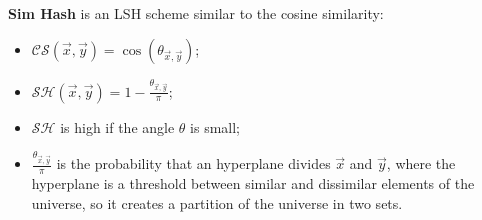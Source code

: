 	\ex \textbf{Sim Hash} is an LSH scheme similar to the cosine similarity:
	\begin{itemize}
		\item $\mathcal{CS}(\vec{x},\vec{y})=
			\cos(\theta_{\vec{x},\vec{y}}) $;
		\item $\mathcal{SH}(\vec{x},\vec{y})=
			1-\frac{\theta_{\vec{x},\vec{y}}}{\pi} $;
		\item $\mathcal{SH}$ is high if the angle $\theta$ is small;
		\item $\frac{\theta_{\vec{x},\vec{y}}}{\pi}$ is the probability that an hyperplane divides $\vec{x}$ and $\vec{y}$, where the hyperplane is a threshold between similar and dissimilar elements of the universe, so it creates a partition of the universe in two sets.
	\end{itemize}
	
	
	
	
	